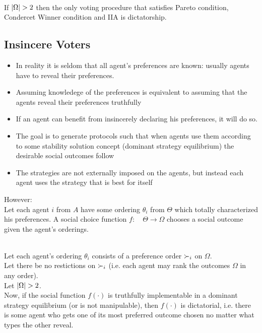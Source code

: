 \begin{theorem}\\
If $\lvert\Omega\rvert>2$ then the only voting procedure that satisfies Pareto condition, Condercet Winner condition and IIA is dictatorship.
\end{theorem}
\subsection{Insincere Voters}
\begin{itemize}
\item In reality it is seldom that all agent's preferences are known: usually agents have to reveal their preferences.
\item Assuming knowledege of the preferences is equivalent to assuming that the agents reveal their preferences truthfully
\item If an agent can benefit from insincerely declaring his preferences, it will do so.
\item The goal is to generate protocols such that when agents use them according to some stability solution concept (dominant strategy equilibrium) the desirable social outcomes follow
\item The strategies are not externally imposed on the agents, but instead each agent uses the strategy that is best for itself
\end{itemize}
However:\\

Let each agent $i$ from $A$ have some ordering $\theta_i$ from $\Theta$ which totally characterized his preferences. A social choice function $f:\quad \Theta \rightarrow \Omega$ chooses a social outcome given the agent's orderings.

\begin{theorem}\\
Let each agent's ordering $\theta_i$ consists of a preference order $\succ_i$ on $\Omega$.\\
Let there be no restictions on $\succ_i$ (i.e. each agent may rank the outcomes $\Omega$ in any order).\\
Let $\lvert\Omega\rvert > 2$.\\
Now, if the social function $f(\cdot)$ is truthfully implementable in a dominant strategy equilibrium (or is not manipulable), then $f(\cdot)$ is dictatorial, i.e. there is some agent who gets one of its most preferred outcome chosen no matter what types the other reveal.
\end{theorem}

